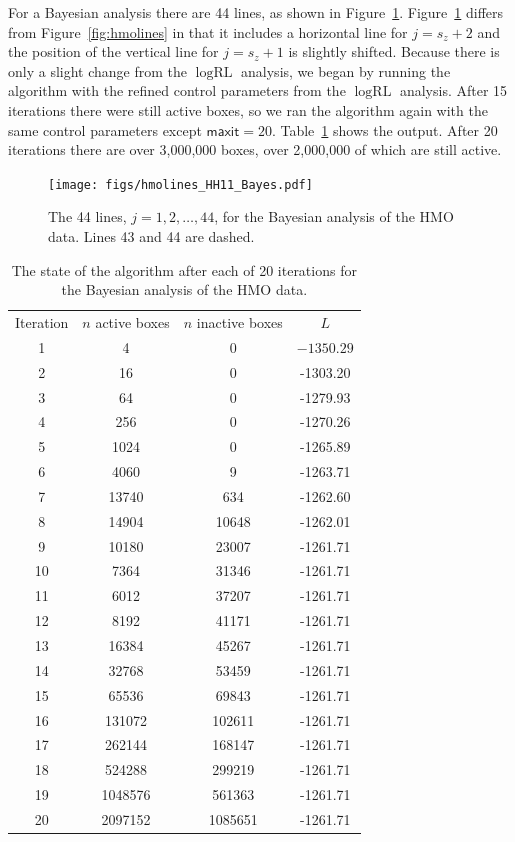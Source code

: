 \documentclass{report}
\newcommand{\textcompute}{\textsf}
\newcommand{\RLorig}{\text{RL}}
\newcommand{\logRLorig}{\log\RLorig}
\newcommand{\maxit}{\textcompute{maxit}}
\begin{document}
For a Bayesian analysis there are 44 lines, as shown in Figure~\ref{fig:hmoBayeslines}.  Figure~\ref{fig:hmoBayeslines} differs from Figure~\ref{fig:hmolines} in that it includes a horizontal line for $j = s_z+2$ and the position of the vertical line for $j = s_z+1$ is slightly shifted.  Because there is only a slight change from the $\logRLorig$ analysis, we began by running the algorithm with the refined control parameters from the $\logRLorig$ analysis.  After 15 iterations there were still active boxes, so we ran the algorithm again with the same control parameters except $\maxit=20$.  Table~\ref{table:hmo_HH11Bayes} shows the output.  After 20 iterations there are over 3,000,000 boxes, over 2,000,000 of which are still active.
\begin{figure}
	\centering
	\texttt{[image: figs/hmolines\_HH11\_Bayes.pdf]}
	\caption{The 44 lines, $j=1, 2, \dots, 44$, for the Bayesian analysis of the HMO data.
	              Lines 43 and 44 are dashed.}
	\label{fig:hmoBayeslines}
\end{figure}

\begin{table}[H]
\centering
\begin{tabular}{|c|c|c|c|}
\hline
Iteration & $n$ active boxes & $n$ inactive boxes & $L$\\
1 & 4 & 0 & $-1350.29$\\
2 & 16 & 0 & -1303.20\\
3 & 64 & 0 & -1279.93\\
4 & 256 & 0 & -1270.26\\
5 & 1024 & 0 & -1265.89\\
6 & 4060 & 9 & -1263.71\\
7 & 13740 & 634 & -1262.60\\
8 & 14904 & 10648 & -1262.01\\
9 & 10180 & 23007 & -1261.71\\
10 & 7364 & 31346 & -1261.71\\
11 & 6012 & 37207 & -1261.71\\
12 & 8192 & 41171 & -1261.71\\
13 & 16384 & 45267 & -1261.71\\
14 & 32768 & 53459 & -1261.71\\
15 & 65536 & 69843 & -1261.71\\
16 & 131072 & 102611 & -1261.71\\
17 & 262144 & 168147 & -1261.71\\
18 & 524288 & 299219 & -1261.71\\
19 & 1048576 & 561363 & -1261.71\\
20 & 2097152 & 1085651 & -1261.71\\
\hline
\end{tabular}
\caption{The state of the algorithm after each of 20 iterations for the Bayesian analysis of the HMO data.}
\label{table:hmo_HH11Bayes}
\end{table}
\end{document}
